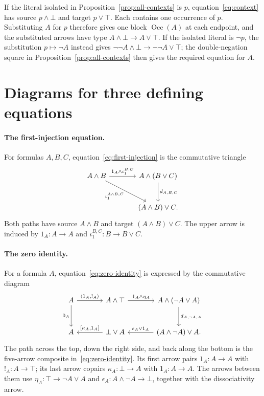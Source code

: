 \documentclass[11pt]{article}
\newcommand{\Occ}{\operatorname{Occ}}
\begin{document}
If the literal isolated in Proposition~\ref{prop:all-contexts}
is $p$, equation~\eqref{eq:context} has source $p\wedge\bot$ and
target $p\vee\top$. Each contains one occurrence of $p$. Substituting $A$ for $p$
therefore gives one block $\Occ(A)$ at each endpoint, and the
substituted arrows have type $A\wedge\bot\to A\vee\top$. If the isolated literal is $\neg p$,
the substitution $p\mapsto\neg A$ instead gives
$\neg\neg A\wedge\bot\to\neg\neg A\vee\top$; the
double-negation square in Proposition~\ref{prop:all-contexts}
then gives the required equation for $A$.

\section{Diagrams for three defining equations}
\label{app:structural-diagrams}

\paragraph{The first-injection equation.}
For formulas $A,B,C$, equation~\eqref{eq:first-injection} is the
commutative triangle
\[
\begin{tikzcd}[column sep=large,row sep=large]
 A\wedge B
   \arrow[r,"1_A\wedge\iota_1^{B,C}"]
   \arrow[dr,"{\iota_1^{A\wedge B,C}}"']
   &A\wedge(B\vee C)\arrow[d,"d_{A,B,C}"]\\
   &(A\wedge B)\vee C.
\end{tikzcd}
\]
Both paths have source $A\wedge B$ and target $(A\wedge B)\vee C$.
The upper arrow is induced by $1_A:A\to A$ and
$\iota_1^{B,C}:B\to B\vee C$.

\paragraph{The zero identity.}
For a formula $A$, equation~\eqref{eq:zero-identity} is expressed by
the commutative diagram
\[
\begin{tikzcd}[column sep=large,row sep=large]
 A\arrow[r,"{\langle1_A,!_A\rangle}"]\arrow[d,"0_A"']
   &A\wedge\top\arrow[r,"1_A\wedge\eta_A"]
   &A\wedge(\neg A\vee A)\arrow[d,"d_{A,\neg A,A}"]\\
 A
   &\bot\vee A\arrow[l,"{[\kappa_A,1_A]}"']
   &(A\wedge\neg A)\vee A\arrow[l,"\epsilon_A\vee1_A"'].
\end{tikzcd}
\]
The path across the top, down the right side, and back along the
bottom is the five-arrow composite in~\eqref{eq:zero-identity}.
Its first arrow pairs $1_A:A\to A$ with $!_A:A\to\top$;
its last arrow copairs $\kappa_A:\bot\to A$ with $1_A:A\to A$.
The arrows between them use
$\eta_A:\top\to\neg A\vee A$ and
$\epsilon_A:A\wedge\neg A\to\bot$, together with the dissociativity arrow.
\end{document}
